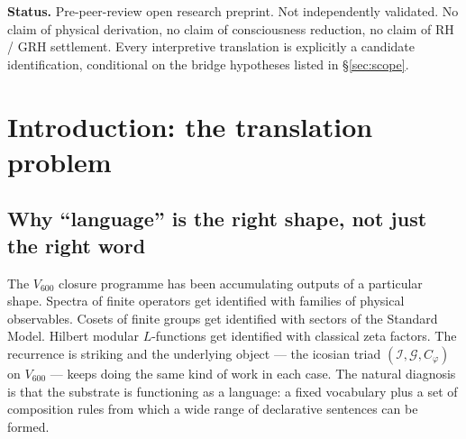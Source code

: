 \documentclass[11pt,a4paper]{article}
\newcommand{\II}{\mathcal{I}}
\newcommand{\Vsix}{V_{600}}
\newcommand{\Cphi}{C_\varphi}
\begin{document}
\begin{abstract}
These three results are the grammar: a positive rule
($\lambda = 12$ is admissible), a uniqueness claim ($\lambda \ne 12$
is forbidden), and a syntactic structure (the $A_5$ character split
of the lifted vs.\ residual blocks). On top of this grammar sit
two further classes of artefact: a \emph{transformation taxonomy}
that names twelve legal moves and five admissibility classes, with
which physical-interpretation labels are formally tied; and a
relational reasoning system (\texttt{closure\_ai} / \texttt{min\_aria})
that uses the engine's admissibility verdicts as its own state-
transition rules, demonstrating that the language is
\emph{compositional and productive} in the formal-language sense.

The paper's claim is not that this language settles physics. It is
that the substrate has crossed the threshold from metaphor to
formal language: dictionary, grammar, and translation are all
exhibited on reproducible artefacts. The substrate can be assessed
by the standards used to assess other working mathematical
languages.
\end{abstract}

\bigskip

\noindent\textbf{Status.} Pre-peer-review open research preprint.
Not independently validated. No claim of physical derivation, no
claim of consciousness reduction, no claim of RH / GRH settlement.
Every interpretive translation is explicitly a candidate
identification, conditional on the bridge hypotheses listed in
\S\ref{sec:scope}.

\bigskip

\tableofcontents

\newpage

\section{Introduction: the translation problem}
\label{sec:intro}

\subsection{Why ``language'' is the right shape, not just the right word}

The $V_{600}$ closure programme has been accumulating outputs of a
particular shape. Spectra of finite operators get identified with
families of physical observables. Cosets of finite groups get
identified with sectors of the Standard Model. Hilbert modular
$L$-functions get identified with classical zeta factors. The
recurrence is striking and the underlying object --- the icosian
triad $(\II, \mathcal{G}, \Cphi)$ on $\Vsix$ --- keeps doing the same
kind of work in each case. The natural diagnosis is that the
substrate is functioning as a language: a fixed vocabulary plus a
set of composition rules from which a wide range of declarative
sentences can be formed.
\end{document}
